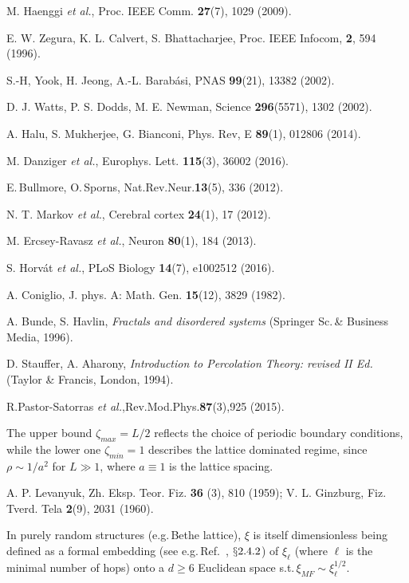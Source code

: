 \documentclass[aps, groupedaddress, superscriptaddress, prl, reprint]{revtex4-1}
\begin{document}
\begin{thebibliography}{99}
 M. Haenggi {\em et al.}, Proc. IEEE Comm. \textbf{27}(7), 1029 (2009).

 E. W. Zegura, K. L. Calvert, S. Bhattacharjee, Proc. IEEE Infocom, \textbf{2}, 594 (1996).

 S.-H, Yook, H. Jeong, A.-L. Barab\'asi, PNAS \textbf{99}(21), 13382 (2002).

 D. J. Watts, P. S. Dodds, M. E. Newman, Science \textbf{296}(5571), 1302 (2002).

 A. Halu, S. Mukherjee, G. Bianconi, Phys. Rev, E \textbf{89}(1), 012806 (2014).

 M. Danziger {\em et al.}, Europhys. Lett. \textbf{115}(3), 36002 (2016).

 E.\,Bullmore, O.\,Sporns, Nat.Rev.Neur.\textbf{13}(5), 336 (2012).

 N. T. Markov \emph{et al.}, Cerebral cortex \textbf{24}(1), 17 (2012).

 M. Ercsey-Ravasz {\em et al.}, Neuron \textbf{80}(1), 184 (2013).

 S. Horv\'at {\em et al.}, PLoS Biology \textbf{14}(7), e1002512 (2016).

 A. Coniglio, J. phys. A: Math. Gen. \textbf{15}(12), 3829 (1982).

 A. Bunde, S. Havlin, {\em Fractals and disordered systems} (Springer Sc.\,\& Business Media, 1996). 

 D. Stauffer, A. Aharony, {\em Introduction to Percolation Theory: revised II Ed.} (Taylor \& Francis, London, 1994).

 R.Pastor-Satorras {\em et al.},Rev.Mod.Phys.\textbf{87}(3),925 (2015).

 The upper bound $\zeta_{max}=L/2$ reflects the choice of periodic boundary conditions, while the lower one $\zeta_{min}=1$ describes the lattice dominated regime, since $\rho\sim1/a^2$ for $L\gg1$, where $a\equiv1$ is the lattice spacing. 

 A. P. Levanyuk, Zh. Eksp. Teor. Fiz. \textbf{36} (3), 810 (1959);
V. L. Ginzburg, Fiz. Tverd. Tela \textbf{2}(9), 2031 (1960).

 In purely random structures (e.g.\,Bethe lattice), $\xi$ is itself dimensionless being defined as a formal embedding (see e.g.\,Ref.~\cite{BuH012}, $\mathsection2.4.2$) of $\xi_\ell$ (where $\ell$ is the minimal number\vspace*{-0.06cm} 
\noindent 
of hops) onto a $d\geq6$ Euclidean space s.t.\,$\xi_{MF}\sim\xi_\ell^{1/2}$.


\end{thebibliography}
\end{document}
